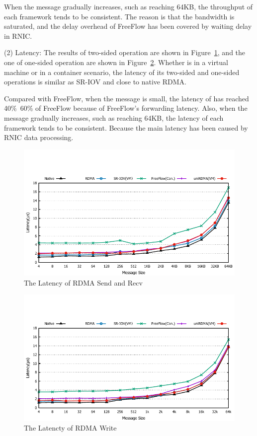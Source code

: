 When the message gradually increases, such as reaching 64KB, the throughput of each framework tends to be consistent. The reason is that the bandwidth is saturated, and the delay overhead of FreeFlow has been covered by waiting delay in RNIC.

(2) Latency: The results of two-sided operation are shown in Figure~\ref{fig:send-lat}, and the one of one-sided operation are shown in Figure~\ref{fig:write-lat}. Whether \sys is in a virtual machine or in a container scenario, the latency of its two-sided and one-sided operations is similar as SR-IOV and close to native RDMA.

Compared with FreeFlow, when the message is small, the latency of \sys has reached 40\%~60\% of FreeFlow because of FreeFlow's forwarding latency. Also, when the message gradually increases, such as reaching 64KB, the latency of each framework tends to be consistent. Because the main latency has been caused by RNIC data processing.

\begin{figure}[!ht]
	\centering
	\includegraphics[width=1.0\linewidth]{images/send-lat.pdf}
	\caption{The Latency of RDMA Send and Recv}
	\label{fig:send-lat}
\end{figure}

\begin{figure}[!ht]
	\centering
	\includegraphics[width=1.0\linewidth]{images/write-lat.pdf}
	\caption{The Latencty of RDMA Write}
	\label{fig:write-lat}
\end{figure}

